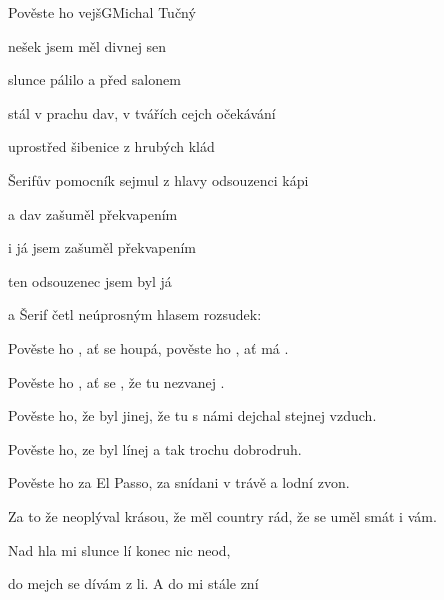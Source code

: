 \begin{song}{Pověste ho vejš}{G}{Michal Tučný}

\begin{SBChorus*}

nešek jsem měl divnej sen

slunce pálilo a před salonem

stál v prachu dav, v tvářích cejch očekávání

uprostřed šibenice z hrubých klád

Šerifův pomocník sejmul z hlavy odsouzenci kápi

a dav zašuměl překvapením

i já jsem zašuměl překvapením

ten odsouzenec jsem byl já

a Šerif četl neúprosným hlasem rozsudek:

\end{SBChorus*}

\begin{SBVerse}

Pověste ho , ať se houpá, pověste ho , ať má .

Pověste ho , ať se , že tu  nezvanej .

\end{SBVerse}

\begin{SBVerse}

Pověste ho, že byl jinej, že tu s námi dejchal stejnej vzduch.

Pověste ho, ze byl línej a tak trochu dobrodruh.

\end{SBVerse}

\begin{SBVerse}

Pověste ho za El Passo, za snídani v trávě a lodní zvon.

Za to že neoplýval krásou, že měl country rád, že se uměl smát i vám.

\end{SBVerse}

\begin{SBChorus}

Nad hla mi slunce lí konec  nic neod,

do mejch  se dívám z li. A do  mi stále zní


\end{SBChorus}
\end{song}

